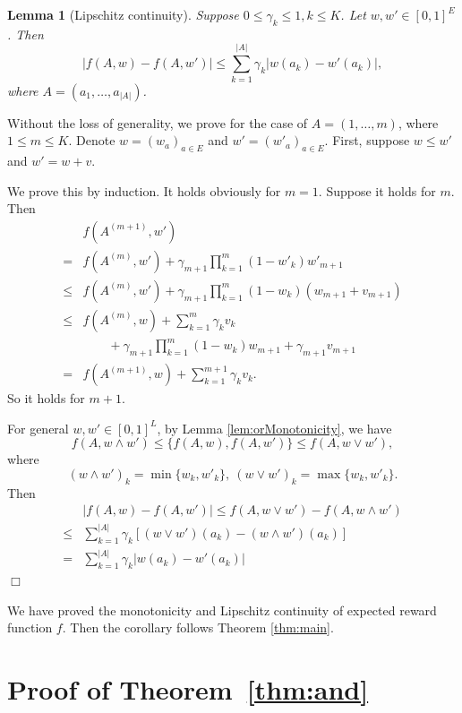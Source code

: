 \documentclass{article}
\newtheorem{lemma}[theorem]{Lemma}%
\newenvironment{proof}{\noindent {\textbf{Proof. }}}{$\Box$ \medskip}
\begin{document}
\begin{lemma}[Lipschitz continuity]
	\label{lem:orLip}
	Suppose $0 \leq \gamma_k \leq 1, k \leq K$. Let $w, w'\in [0,1]^{E}$. Then
	$$
	|f(A, w) - f(A, w')| \leq \sum_{k=1}^{|A|} \gamma_k |w(a_k) - w'(a_k)|,
	$$
	where $A = (a_1, \ldots, a_{|A|})$.
\end{lemma}
\begin{proof}
	Without the loss of generality, we prove for the case of $A = (1, \ldots, m)$, where $1 \leq m \leq K$. Denote $w = (w_a)_{a \in E}$ and $w' = (w'_a)_{a \in E}$. First, suppose $w \leq w'$ and $w' = w + v$.
	
	We prove this by induction. It holds obviously for $m = 1$. Suppose it holds for $m$. Then
	\begin{align*}
		&f(A^{(m+1)}, w')\\
		=&f(A^{(m)}, w') + \gamma_{m+1}\prod_{k=1}^m(1 - w'_k) w'_{m+1}\\
		\leq &f(A^{(m)}, w') +  \gamma_{m+1} \prod_{k=1}^m(1 - w_k) (w_{m+1} + v_{m+1})\\
		\leq &f(A^{(m)}, w) + \sum_{k=1}^m \gamma_k v_k \\
		&\qquad + \gamma_{m+1} \prod_{k=1}^m(1 - w_k) w_{m+1} + \gamma_{m+1} v_{m+1}\\
		=& f(A^{(m+1)}, w) + \sum_{k=1}^{m+1} \gamma_k v_k.
	\end{align*}
	So it holds for $m+1$.
	
	For general $w,w' \in [0,1]^L$, by Lemma \ref{lem:orMonotonicity}, we have
	$$
	f(A, w\wedge w') \leq \{f(A, w), f(A, w') \}\leq f(A, w\vee w'),
	$$
	where 
	$$
	(w\wedge w')_k = \min\{w_k, w'_k\}, ~ (w\vee w')_k = \max\{w_k, w'_k\}.
	$$
	Then
	\begin{align*}
		&|f(A,w) - f(A,w')| \leq f(A, w\vee w') - f(A, w\wedge w')\\
		\leq & \sum_{k=1}^{|A|} \gamma_k [(w\vee w')(a_k) - (w\wedge w')(a_k)]\\
		=& \sum_{k=1}^{|A|} \gamma_k |w(a_k) - w'(a_k)|
	\end{align*}
\end{proof}

We have proved the monotonicity and Lipschitz continuity of expected reward function $f$. Then the corollary follows Theorem \ref{thm:main}.

\section{Proof of Theorem~\ref{thm:and}}
\end{document}
